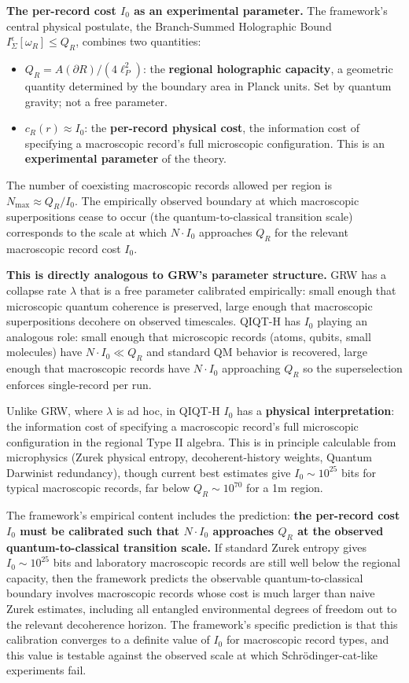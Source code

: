 \documentclass[11pt,a4paper]{article}
\begin{document}
\textbf{The per-record cost $I_0$ as an experimental parameter.} The framework's central physical postulate, the Branch-Summed Holographic Bound $I_\Sigma^\epsilon[\omega_R] \le Q_R$, combines two quantities:
\begin{itemize}
  \item $Q_R = A(\partial R)/(4\ell_P^2)$: the \textbf{regional holographic capacity}, a geometric quantity determined by the boundary area in Planck units. Set by quantum gravity; not a free parameter.
  \item $c_R(r) \approx I_0$: the \textbf{per-record physical cost}, the information cost of specifying a macroscopic record's full microscopic configuration. This is an \textbf{experimental parameter} of the theory.
\end{itemize}

The number of coexisting macroscopic records allowed per region is $N_{\max} \approx Q_R/I_0$. The empirically observed boundary at which macroscopic superpositions cease to occur (the quantum-to-classical transition scale) corresponds to the scale at which $N \cdot I_0$ approaches $Q_R$ for the relevant macroscopic record cost $I_0$.

\textbf{This is directly analogous to GRW's parameter structure.} GRW has a collapse rate $\lambda$ that is a free parameter calibrated empirically: small enough that microscopic quantum coherence is preserved, large enough that macroscopic superpositions decohere on observed timescales. QIQT-H has $I_0$ playing an analogous role: small enough that microscopic records (atoms, qubits, small molecules) have $N \cdot I_0 \ll Q_R$ and standard QM behavior is recovered, large enough that macroscopic records have $N \cdot I_0$ approaching $Q_R$ so the superselection enforces single-record per run.

Unlike GRW, where $\lambda$ is ad hoc, in QIQT-H $I_0$ has a \textbf{physical interpretation}: the information cost of specifying a macroscopic record's full microscopic configuration in the regional Type II algebra. This is in principle calculable from microphysics (Zurek physical entropy, decoherent-history weights, Quantum Darwinist redundancy), though current best estimates give $I_0 \sim 10^{25}$ bits for typical macroscopic records, far below $Q_R \sim 10^{70}$ for a 1m region.

The framework's empirical content includes the prediction: \textbf{the per-record cost $I_0$ must be calibrated such that $N \cdot I_0$ approaches $Q_R$ at the observed quantum-to-classical transition scale.} If standard Zurek entropy gives $I_0 \sim 10^{25}$ bits and laboratory macroscopic records are still well below the regional capacity, then the framework predicts the observable quantum-to-classical boundary involves macroscopic records whose cost is much larger than naive Zurek estimates, including all entangled environmental degrees of freedom out to the relevant decoherence horizon. The framework's specific prediction is that this calibration converges to a definite value of $I_0$ for macroscopic record types, and this value is testable against the observed scale at which Schrödinger-cat-like experiments fail.
\end{document}
